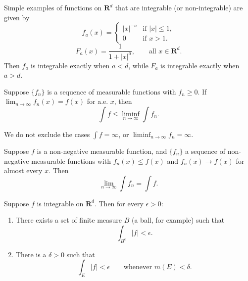 \begin{example}
	Simple examples of functions on $\mathbf{R}^d$ that are integrable
	(or non-integrable) are given by
	\begin{equation}
	f_a(x) =
	\begin{cases}
	|x|^{-a} & \text{if } |x| \leq 1,\\
	0 & \text{if } x > 1.
	\end{cases}
	\end{equation}
	\begin{equation}
	F_a(x) = \frac{1}{1 + |x|^a}, \qquad \text{all } x \in \mathbf{R}^d.
	\end{equation}
	Then $f_a$ is integrable exactly when $a < d$, while $F_a$ is integrable
	exactly when $a > d$.
\end{example}

\begin{lemma}[Fatou]
	Suppose $\{f_n\}$ is a sequence of measurable functions with $f_n \geq 0$.
	If $\lim_{n \to \infty} f_n(x) = f(x)$ for a.e. $x$, then
	\begin{equation}
	\int f \leq \liminf_{n \to \infty} \int f_n.
	\end{equation}
\end{lemma}

\begin{remark}
	We do not exclude the cases $\int f = \infty$,
	or $\liminf_{n \to \infty} f_n = \infty$.
\end{remark}

\begin{corollary}
	Suppose $f$ is a non-negative measurable function, and $\{f_n\}$ a sequence
	of non-negative measurable functions with
	$f_n(x) \leq f(x)$ and $f_n(x) \to f(x)$ for almost every $x$. Then
	\begin{equation}
	\lim_{n \to \infty} \int f_n = \int f.
	\end{equation}
\end{corollary}

\begin{proposition}
	Suppose $f$ is integrable on $\mathbf{R}^d$. Then for every $\epsilon > 0$:
	\begin{enumerate}
		\renewcommand{\theenumi}{\roman{enumi}}
		\item There exists a set of finite measure $B$ (a ball, for example) such that
		\begin{equation}
		\int_{B^c} |f| < \epsilon.
		\end{equation}
		\item There is a $\delta > 0$ such that
		\begin{equation}
		\int_E |f| < \epsilon \qquad \text{whenever } m(E) < \delta.
		\end{equation}
	\end{enumerate}
\end{proposition}


